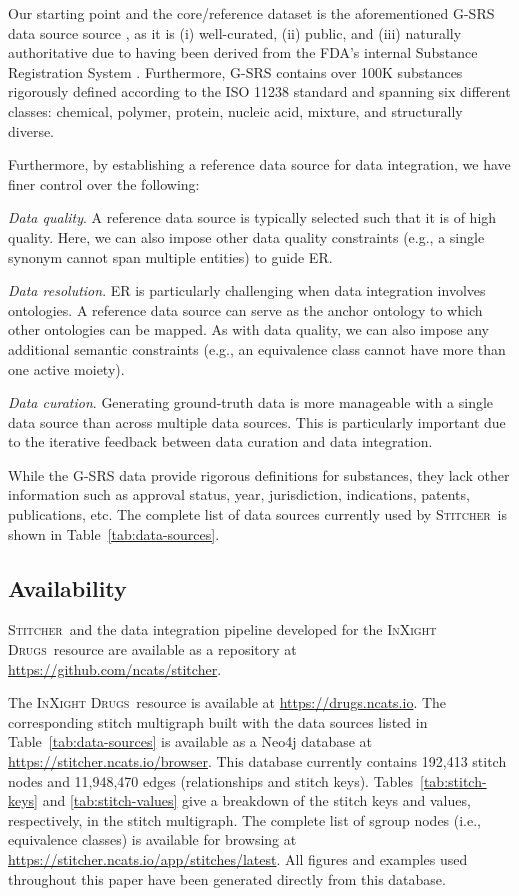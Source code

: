 \documentclass{bmcart}
\newcommand\st{\textsc{Stitcher}}
\newcommand\ix{\textsc{InXight Drugs}}
\begin{document}
Our starting point and the core/reference dataset is the
aforementioned G-SRS data source source \cite{GSRSData}, as it is (i)
well-curated, (ii) public, and (iii) naturally authoritative due to
having been derived from the FDA’s internal Substance Registration
System \cite{GSRS}. Furthermore, G-SRS contains over 100K substances
rigorously defined according to the ISO 11238 standard and spanning
six different classes: chemical, polymer, protein, nucleic acid,
mixture, and structurally diverse.

Furthermore, by establishing a reference data source
for data integration, we have finer control over the following: 
\begin{description}
\item{\emph{Data quality}.} A reference data source is typically
selected such that it is of high quality. Here, we can also impose
other data quality constraints (e.g., a single synonym cannot span
multiple entities) to guide ER. 
\item{\emph{Data resolution}.} ER is particularly
challenging when data integration involves ontologies. A reference
data source can serve as the anchor ontology to which other
ontologies can be mapped. As with data quality, we can also impose any
additional semantic constraints (e.g., an equivalence class cannot
have more than one active moiety). 
\item{\emph{Data curation}.} Generating ground-truth data is more
manageable with a single data source than across multiple data sources.
This is particularly important due to the iterative feedback between
data curation and data integration. 
\end{description}
While the G-SRS data provide rigorous definitions for substances, they lack
other information such as approval status, year, jurisdiction,
indications, patents, publications, etc. The complete list of
data sources currently used by \st\ is shown in Table~\ref{tab:data-sources}.

\subsection*{Availability}
\st\ and the data integration pipeline developed for the \ix\ resource 
are available as a repository at \url{https://github.com/ncats/stitcher}.

The \ix\ resource is available at \url{https://drugs.ncats.io}. The
corresponding stitch multigraph built with the data sources listed in
Table~\ref{tab:data-sources} is available as a Neo4j database  at
\url{https://stitcher.ncats.io/browser}. This database currently
contains 192,413 stitch nodes and 11,948,470 edges (relationships and
stitch keys). Tables~\ref{tab:stitch-keys} and \ref{tab:stitch-values}  
give a breakdown of the stitch keys and values, respectively, in the
stitch multigraph. The complete list of sgroup nodes (i.e.,
equivalence classes) is available for browsing at 
\url{https://stitcher.ncats.io/app/stitches/latest}. All figures and
examples used throughout this paper have been generated directly from
this database.
\end{document}
